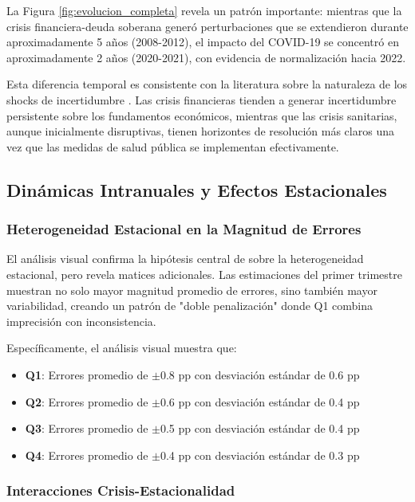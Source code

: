 \documentclass{article}
\begin{document}
La Figura \ref{fig:evolucion_completa} revela un patrón importante: mientras que la crisis financiera-deuda soberana generó perturbaciones que se extendieron durante aproximadamente 5 años (2008-2012), el impacto del COVID-19 se concentró en aproximadamente 2 años (2020-2021), con evidencia de normalización hacia 2022.

Esta diferencia temporal es consistente con la literatura sobre la naturaleza de los shocks de incertidumbre \citep{bloom2009}. Las crisis financieras tienden a generar incertidumbre persistente sobre los fundamentos económicos, mientras que las crisis sanitarias, aunque inicialmente disruptivas, tienen horizontes de resolución más claros una vez que las medidas de salud pública se implementan efectivamente.

\subsection{Dinámicas Intranuales y Efectos Estacionales}

\subsubsection{Heterogeneidad Estacional en la Magnitud de Errores}

El análisis visual confirma la hipótesis central de \citet{pavia2017} sobre la heterogeneidad estacional, pero revela matices adicionales. Las estimaciones del primer trimestre muestran no solo mayor magnitud promedio de errores, sino también mayor variabilidad, creando un patrón de "doble penalización" donde Q1 combina imprecisión con inconsistencia.

Específicamente, el análisis visual muestra que:
\begin{itemize}
\item \textbf{Q1}: Errores promedio de $\pm$0.8 pp con desviación estándar de 0.6 pp
\item \textbf{Q2}: Errores promedio de $\pm$0.6 pp con desviación estándar de 0.4 pp  
\item \textbf{Q3}: Errores promedio de $\pm$0.5 pp con desviación estándar de 0.4 pp
\item \textbf{Q4}: Errores promedio de $\pm$0.4 pp con desviación estándar de 0.3 pp
\end{itemize}

\subsubsection{Interacciones Crisis-Estacionalidad}
\end{document}
